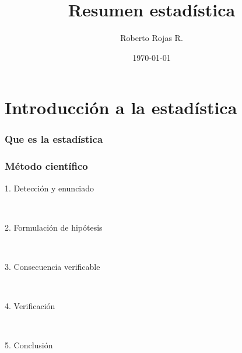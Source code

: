 \documentclass[10pt,letterpaper,oneside]{report}
\begin{document}
\title{Resumen estadística}
\author{Roberto Rojas R.}
\date{\today}
\maketitle

\chapter{Introducción a la estadística}
  \subsection{Que es la estadística}

  \subsection{Método científico}
    \begin{description}
      \item[1. Detección y enunciado] \hfill \\
      \item[2. Formulación de hipótesis] \hfill \\
      \item[3. Consecuencia verificable] \hfill \\
      \item[4. Verificación] \hfill \\
      \item[5. Conclusión] \hfill \\
    \end{description}
\end{document}
